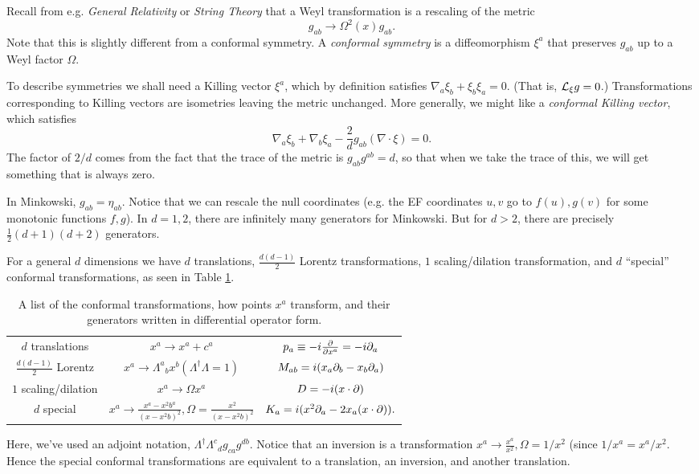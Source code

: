 Recall from e.g. \emph{General Relativity} or \emph{String Theory} that a Weyl transformation is a rescaling of the metric
\begin{equation}
    g_{ab} \to \Omega^2(x) g_{ab}.
\end{equation}
Note that this is slightly different from a conformal symmetry. A \emph{conformal symmetry} is a diffeomorphism $\xi^a$ that preserves $g_{ab}$ up to a Weyl factor $\Omega$.

To describe symmetries we shall need a Killing vector $\xi^a$, which by definition satisfies $\nabla_a \xi_b + \xi_b \xi_a=0$. (That is, $\mathcal L_\xi g=0$.) Transformations corresponding to Killing vectors are isometries leaving the metric unchanged. More generally, we might like a \emph{conformal Killing vector}, which satisfies
\begin{equation}
     \nabla_a \xi_b + \nabla_b \xi_a -\frac{2}{d} g_{ab}(\nabla \cdot \xi)=0.
\end{equation}
The factor of $2/d$ comes from the fact that the trace of the metric is $g_{ab} g^{ab}=d$, so that when we take the trace of this, we will get something that is always zero.

In Minkowski, $g_{ab}=\eta_{ab}$. Notice that we can rescale the null coordinates (e.g. the EF coordinates $u,v$ go to $f(u),g(v)$ for some monotonic functions $f,g$). In $d=1,2$, there are infinitely many generators for Minkowski. But for $d>2$, there are precisely $\frac{1}{2} (d+1)(d+2)$ generators.

For a general $d$ dimensions we have $d$ translations, $\frac{d(d-1)}{2}$ Lorentz transformations, $1$ scaling/dilation transformation, and $d$ ``special'' conformal transformations, as seen in Table \ref{tab:conformalsymmetries}.
\begin{table}[]
    \centering
    \begin{tabular}{c|c |c}
        &  \\\hline
        $d$ translations & $x^a \to x^a +c^a$ & $p_a \equiv -i \frac{\partial }{\partial x^a} = -i \partial_a$ \\
        $\frac{d(d-1)}{2}$ Lorentz & $x^a \to \Lambda^a{}_b x^b (\Lambda^\dagger \Lambda=1)$ & $M_{ab}=i(x_a \partial_b -x_b \partial_a)$ \\
        $1$ scaling/dilation & $x^a \to \Omega x^a$ & $D=-i(x\cdot \partial)$ \\
        $d$ special & $x^a \to \frac{x^a-x^2 b^a}{(x-x^2 b)^2}, \Omega =\frac{x^2}{(x-x^2 b)^2}$ & $K_a = i(x^2 \partial_a - 2 x_a( x\cdot \partial)).$
    \end{tabular}
    \caption{A list of the conformal transformations, how points $x^a$ transform, and their generators written in differential operator form.}
    \label{tab:conformalsymmetries}
\end{table}
Here, we've used an adjoint notation, $\Lambda^\dagger \Lambda^c{}_d g_{ca} g^{db}$. Notice that an inversion is a transformation $x^a \to \frac{x^a}{x^2}, \Omega = 1/x^2$ (since $1/x^a= x^a/x^2$. Hence the special conformal transformations are equivalent to a translation, an inversion, and another translation.


